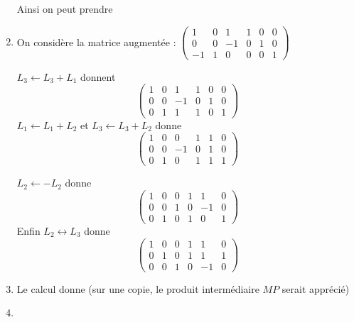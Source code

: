 \documentclass[a4paper, 11pt,reqno]{article}
\begin{document}
\begin{correction}
\begin{enumerate}
Ainsi on peut prendre 

\item  On considère la matrice augmentée : 
$\left(\begin{array}{ccc|ccc}  
1&0&1 & 1&0&0 \\
0&0&-1& 0&1&0 \\
-1&1&0& 0&0&1 
\end{array}\right)$

$L_3\leftarrow L_3+L_1$  donnent
$$\left(\begin{array}{ccc|ccc}  
1&0&1 & 1&0&0 \\
0&0&-1& 0&1&0 \\
0&1&1& 1&0&1 
\end{array}\right)$$
$L_1\leftarrow L_1+L_2$ et $L_3\leftarrow L_3+L_2$
donne 
$$\left(\begin{array}{ccc|ccc}  
1&0&0 & 1&1&0 \\
0&0&-1& 0&1&0 \\
0&1&0& 1&1&1 
\end{array}\right)$$

$L_2\leftarrow -L_2$
donne 
$$\left(\begin{array}{ccc|ccc}  
1&0&0 & 1&1&0 \\
0&0&1& 0&-1&0 \\
0&1&0& 1&0&1 
\end{array}\right)$$
Enfin 
$L_2\leftrightarrow L_3$
donne 
$$\left(\begin{array}{ccc|ccc}  
1&0&0 & 1&1&0 \\
0&1&0& 1&1&1 \\
0&0&1& 0&-1&0 
\end{array}\right)$$


\item Le calcul donne  
(sur une copie, le produit intermédiaire $MP$ serait apprécié)

\item 



\end{enumerate}
\end{correction}
\end{document}

